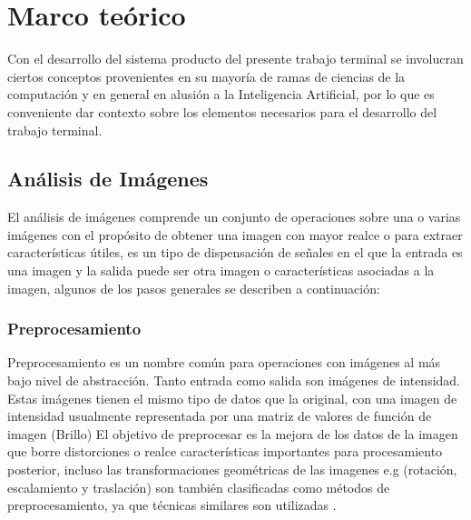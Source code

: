 \chapter{Marco teórico}
Con el desarrollo del sistema producto del presente trabajo terminal se involucran ciertos conceptos provenientes en su mayoría de ramas de ciencias de la computación y en general en alusión a la Inteligencia Artificial, por lo que es conveniente dar contexto sobre los elementos necesarios para el desarrollo del trabajo terminal.
\section{Análisis de Imágenes}
        El análisis de imágenes comprende un conjunto de operaciones sobre una o varias imágenes con el propósito de obtener una imagen con mayor realce o para extraer características útiles, es un tipo de dispensación de señales en el que la entrada es una imagen y la salida puede ser otra imagen o características asociadas a la imagen, algunos de los pasos generales se describen a continuación:
        
        \subsection{Preprocesamiento}
            Preprocesamiento es un nombre común para operaciones con imágenes al más bajo nivel de abstracción. Tanto entrada como salida son imágenes de intensidad. Estas imágenes tienen el mismo tipo de datos que la original, con una imagen de intensidad usualmente representada por una matriz de valores de función de imagen (Brillo) El objetivo de preprocesar es la mejora de los datos de la imagen que borre distorciones o realce características importantes para procesamiento posterior, incluso las transformaciones geométricas de las imagenes e.g (rotación, escalamiento y traslación) son también clasificadas como métodos de preprocesamiento, ya que técnicas similares son utilizadas \cite{imgAnalySeg}.
               
                
